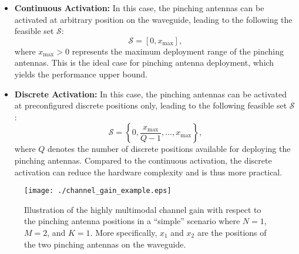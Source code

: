 \begin{itemize}
    \item \textbf{Continuous Activation:} In this case, the pinching antennas can be activated at arbitrary position on the waveguide, leading to the following the feasible set $\mathcal{S}$:
    \begin{equation}
        \mathcal{S} = [0, x_{\max}],
    \end{equation} 
    where $x_{\max} > 0$ represents the maximum deployment range of the pinching antennas. This is the ideal case for pinching antenna deployment, which yields the performance upper bound.
    \item \textbf{Discrete Activation:} In this case, the pinching antennas can be activated at preconfigured discrete positions only, leading to the following feasible set $\mathcal{S}$: 
    \begin{equation}
        \mathcal{S} = \left\{0, \frac{x_{\max}}{Q-1}, \dots,x_{\max} \right\},
    \end{equation} 
    where $Q$ denotes the number of discrete positions available for deploying the pinching antennas. Compared to the continuous activation, the discrete activation can reduce the hardware complexity and is thus more practical. 
\end{itemize}

\begin{figure}[t!]
    \centering
    \texttt{[image: ./channel\_gain\_example.eps]}
    \caption{Illustration of the highly multimodal channel gain with respect to the pinching antenna positions in a “simple” scenario where $N = 1$, $M=2$, and $K=1$. More specifically, $x_1$ and $x_2$ are the positions of the two pinching antennas on the waveguide.}
    \label{fig_multimodal}
\end{figure}


